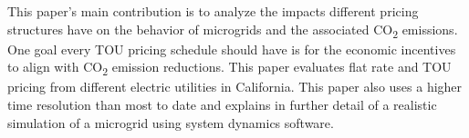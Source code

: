 \documentclass[conference]{IEEEtran}
\begin{document}
			This paper's main contribution is to analyze the impacts different pricing structures have on the behavior of microgrids and the associated CO\textsubscript{2} emissions. One goal every TOU pricing schedule should have is for the economic incentives to align with CO\textsubscript{2} emission reductions. This paper evaluates flat rate and TOU pricing from different electric utilities in California. This paper also uses a higher time resolution than most to date and explains in further detail of a realistic simulation of a microgrid using system dynamics software.  
%       			
\end{document}
